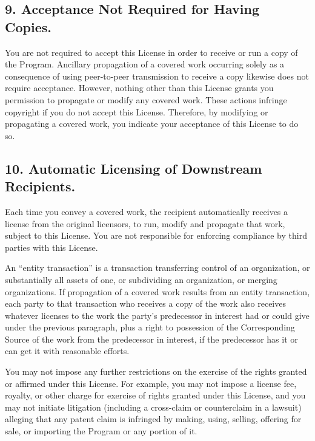 \subsection{9. Acceptance Not Required for Having Copies.}
You are not required to accept this License in order to receive or run a copy of the Program. Ancillary propagation of a covered work occurring solely as a consequence of using peer-to-peer transmission to receive a copy likewise does not require acceptance. However, nothing other than this License grants you permission to propagate or modify any covered work. These actions infringe copyright if you do not accept this License. Therefore, by modifying or propagating a covered work, you indicate your acceptance of this License to do so.
\subsection{10. Automatic Licensing of Downstream Recipients.}
Each time you convey a covered work, the recipient automatically receives a license from the original licensors, to run, modify and propagate that work, subject to this License. You are not responsible for enforcing compliance by third parties with this License.\par
An “entity transaction” is a transaction transferring control of an organization, or substantially all assets of one, or subdividing an organization, or merging organizations. If propagation of a covered work results from an entity transaction, each party to that transaction who receives a copy of the work also receives whatever licenses to the work the party's predecessor in interest had or could give under the previous paragraph, plus a right to possession of the Corresponding Source of the work from the predecessor in interest, if the predecessor has it or can get it with reasonable efforts.\par
You may not impose any further restrictions on the exercise of the rights granted or affirmed under this License. For example, you may not impose a license fee, royalty, or other charge for exercise of rights granted under this License, and you may not initiate litigation (including a cross-claim or counterclaim in a lawsuit) alleging that any patent claim is infringed by making, using, selling, offering for sale, or importing the Program or any portion of it.
